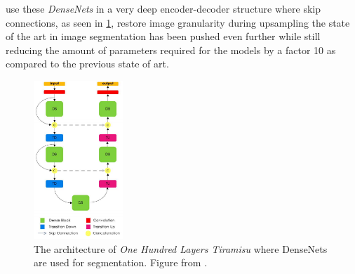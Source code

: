 \documentclass{kththesis}
\begin{document}
\textcite{jegou2017one} use these \emph{DenseNets} in a very deep encoder-decoder
structure where skip connections, as seen in \cref{fig:Tiramisu}, restore image granularity during upsampling the
state of the art in image segmentation has been pushed even further while still reducing the amount of parameters required
for the models by a factor 10 as compared to the previous state of art. 

\begin{figure}[h]
  \centering
  \includegraphics[width=0.3\textwidth]{Tiramisu}
  \caption{The architecture of \textit{One Hundred Layers Tiramisu} where
    DenseNets are used for segmentation. Figure from \textcite[]{jegou2017one}.}
  \label{fig:Tiramisu}
  \end{figure}
\end{document}
